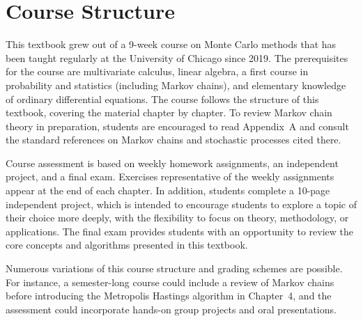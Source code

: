 \section{Course Structure}
\label{sec:1.5}

This textbook grew out of a 9-week course on Monte Carlo methods that has been taught regularly
at the University of Chicago since 2019. The prerequisites for the course are multivariate
calculus, linear algebra, a first course in probability and statistics (including Markov chains),
and elementary knowledge of ordinary differential equations. The course follows the structure of
this textbook, covering the material chapter by chapter. To review Markov chain theory in
preparation, students are encouraged to read Appendix~A and consult the standard references on
Markov chains and stochastic processes cited there.

Course assessment is based on weekly homework assignments, an independent project, and a final
exam. Exercises representative of the weekly assignments appear at the end of each chapter.
In addition, students complete a 10-page independent project, which is intended to encourage
students to explore a topic of their choice more deeply, with the flexibility to focus on theory,
methodology, or applications. The final exam provides students with an opportunity to review the
core concepts and algorithms presented in this textbook.

Numerous variations of this course structure and grading schemes are possible. For instance,
a semester-long course could include a review of Markov chains before introducing the
Metropolis Hastings algorithm in Chapter~4, and the assessment could incorporate hands-on group
projects and oral presentations.
